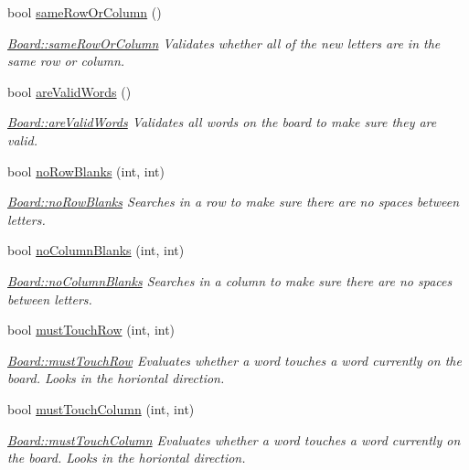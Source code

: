 \begin{DoxyCompactItemize}
bool \hyperlink{class_board_a55a3b8ed8db758006476f8649cd4e86d}{same\-Row\-Or\-Column} ()
\begin{DoxyCompactList}\small\item\em \hyperlink{class_board_a55a3b8ed8db758006476f8649cd4e86d}{Board\-::same\-Row\-Or\-Column} Validates whether all of the new letters are in the same row or column. \end{DoxyCompactList}\item 
bool \hyperlink{class_board_a581529380e6d774493cac106b4175713}{are\-Valid\-Words} ()
\begin{DoxyCompactList}\small\item\em \hyperlink{class_board_a581529380e6d774493cac106b4175713}{Board\-::are\-Valid\-Words} Validates all words on the board to make sure they are valid. \end{DoxyCompactList}\item 
bool \hyperlink{class_board_ac10ff5523509663aeeb2981b34b49876}{no\-Row\-Blanks} (int, int)
\begin{DoxyCompactList}\small\item\em \hyperlink{class_board_ac10ff5523509663aeeb2981b34b49876}{Board\-::no\-Row\-Blanks} Searches in a row to make sure there are no spaces between letters. \end{DoxyCompactList}\item 
bool \hyperlink{class_board_a250ab5327ae12589735081acf27151b1}{no\-Column\-Blanks} (int, int)
\begin{DoxyCompactList}\small\item\em \hyperlink{class_board_a250ab5327ae12589735081acf27151b1}{Board\-::no\-Column\-Blanks} Searches in a column to make sure there are no spaces between letters. \end{DoxyCompactList}\item 
bool \hyperlink{class_board_abe67f0d5f2ba801487546ce4751c5318}{must\-Touch\-Row} (int, int)
\begin{DoxyCompactList}\small\item\em \hyperlink{class_board_abe67f0d5f2ba801487546ce4751c5318}{Board\-::must\-Touch\-Row} Evaluates whether a word touches a word currently on the board. Looks in the horiontal direction. \end{DoxyCompactList}\item 
bool \hyperlink{class_board_ad0067becfa518afbba904a6d5d35e200}{must\-Touch\-Column} (int, int)
\begin{DoxyCompactList}\small\item\em \hyperlink{class_board_ad0067becfa518afbba904a6d5d35e200}{Board\-::must\-Touch\-Column} Evaluates whether a word touches a word currently on the board. Looks in the horiontal direction. \end{DoxyCompactList}\item 

\end{DoxyCompactItemize}
